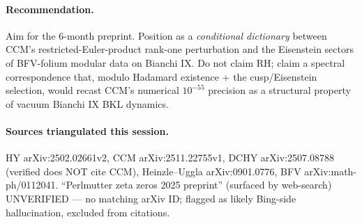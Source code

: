 \documentclass[11pt]{article}
\begin{document}
\paragraph{Recommendation.} Aim for the 6-month preprint. Position as a
\emph{conditional dictionary} between CCM's restricted-Euler-product
rank-one perturbation and the Eisenstein sectors of BFV-folium modular
data on Bianchi IX. Do not claim RH; claim a spectral correspondence
that, modulo Hadamard existence + the cusp/Eisenstein selection, would
recast CCM's numerical \(10^{-55}\) precision as a structural property
of vacuum Bianchi IX BKL dynamics.

\paragraph{Sources triangulated this session.}
HY arXiv:2502.02661v2, CCM arXiv:2511.22755v1, DCHY arXiv:2507.08788
(verified does NOT cite CCM), Heinzle--Uggla arXiv:0901.0776,
BFV arXiv:math-ph/0112041. ``Perlmutter zeta zeros 2025 preprint''
(surfaced by web-search) UNVERIFIED --- no matching arXiv ID;
flagged as likely Bing-side hallucination, excluded from citations.
\end{document}
